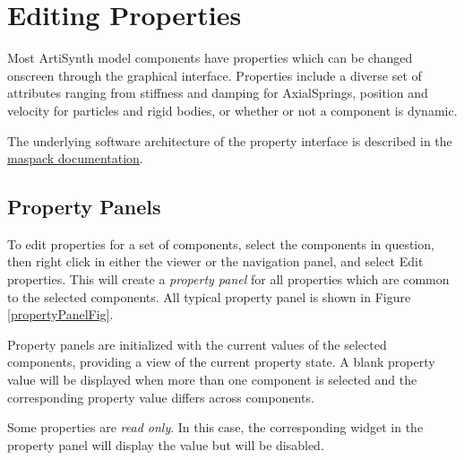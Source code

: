 \documentclass{article}
\begin{document}
\section{Editing Properties}

Most ArtiSynth model components have properties which can be 
changed onscreen through the graphical interface. Properties
include a diverse set of attributes ranging from stiffness and
damping for AxialSprings, position and velocity for particles and
rigid bodies, or whether or not a component is dynamic.

The underlying software architecture of the property interface is 
described in the 
\href{../maspack/maspack.html#Properties}{maspack documentation}.

\subsection{Property Panels}
\label{propertyPanelsSec}

To edit properties for a set of components, select the components in
question, then right click in either the viewer or the navigation
panel, and select {\sf Edit properties}. This will create a {\it property
panel} for all properties which are common to the selected components.
All typical property panel is shown in Figure \ref{propertyPanelFig}.

Property panels are initialized with the current values of the selected
components, providing a view of the current property state. A blank
property value will be displayed when more than one component is selected and 
the corresponding property value differs across components.

Some properties are {\it read only}. In this case, the corresponding
widget in the property panel will display the value but will be
disabled.
\end{document}
